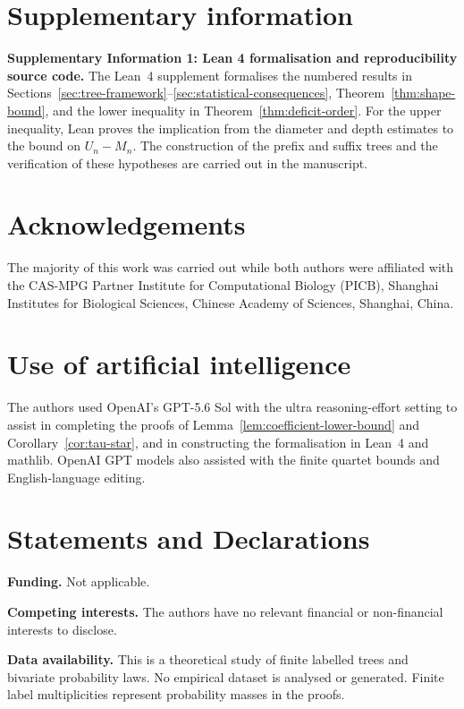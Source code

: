 \documentclass[12pt]{article}
\begin{document}
\section*{Supplementary information}

\textbf{Supplementary Information 1: Lean 4 formalisation and
reproducibility source code.}
The Lean~4 supplement formalises the numbered results in
Sections~\ref{sec:tree-framework}--\ref{sec:statistical-consequences},
Theorem~\ref{thm:shape-bound}, and the lower inequality in
Theorem~\ref{thm:deficit-order}. For the upper inequality, Lean proves
the implication from the diameter and depth estimates to the bound on
$U_n-M_n$. The construction of the prefix and suffix trees and the
verification of these hypotheses are carried out in the manuscript.

\section*{Acknowledgements}

The majority of this work was carried out while both authors were affiliated
with the CAS-MPG Partner Institute for Computational Biology (PICB), Shanghai
Institutes for Biological Sciences, Chinese Academy of Sciences, Shanghai,
China.

\section*{Use of artificial intelligence}

The authors used OpenAI's GPT-5.6 Sol with the ultra reasoning-effort
setting to assist in completing the proofs of
Lemma~\ref{lem:coefficient-lower-bound} and Corollary~\ref{cor:tau-star}, and in
constructing the formalisation in Lean~4 and mathlib.
OpenAI GPT models also assisted with the finite quartet bounds and
English-language editing.

\section*{Statements and Declarations}

\noindent\textbf{Funding.}
Not applicable.

\noindent\textbf{Competing interests.}
The authors have no relevant financial or non-financial interests to disclose.

\noindent\textbf{Data availability.}
This is a theoretical study of finite labelled trees and bivariate
probability laws.  No empirical dataset is analysed or generated.  Finite
label multiplicities represent probability masses in the proofs.
\end{document}
